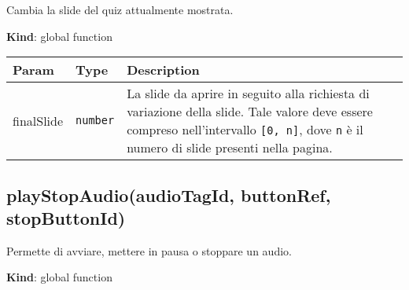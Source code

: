 Cambia la slide del quiz attualmente mostrata.

\textbf{Kind}: global function

\begin{tabularx}{\textwidth}{XXX}
\toprule
\begin{minipage}[b]{0.30\columnwidth}\raggedright
Param\strut
\end{minipage} & \begin{minipage}[b]{0.30\columnwidth}\raggedright
Type\strut
\end{minipage} & \begin{minipage}[b]{0.30\columnwidth}\raggedright
Description\strut
\end{minipage}\tabularnewline
\midrule
\endhead
\begin{minipage}[t]{0.30\columnwidth}\raggedright
finalSlide\strut
\end{minipage} & \begin{minipage}[t]{0.30\columnwidth}\raggedright
\texttt{number}\strut
\end{minipage} & \begin{minipage}[t]{0.30\columnwidth}\raggedright
La slide da aprire in seguito alla richiesta di variazione della slide.
Tale valore deve essere compreso nell'intervallo \texttt{{[}0,\ n{]}},
dove \texttt{n} è il numero di slide presenti nella pagina.\strut
\end{minipage}\tabularnewline
\bottomrule
\end{tabularx}

\protect\hypertarget{playStopAudio}{}{}

\hypertarget{playstopaudioaudiotagid-buttonref-stopbuttonid}{%
\subsection{playStopAudio(audioTagId, buttonRef,
stopButtonId)}\label{playstopaudioaudiotagid-buttonref-stopbuttonid}}

Permette di avviare, mettere in pausa o stoppare un audio.

\textbf{Kind}: global function

